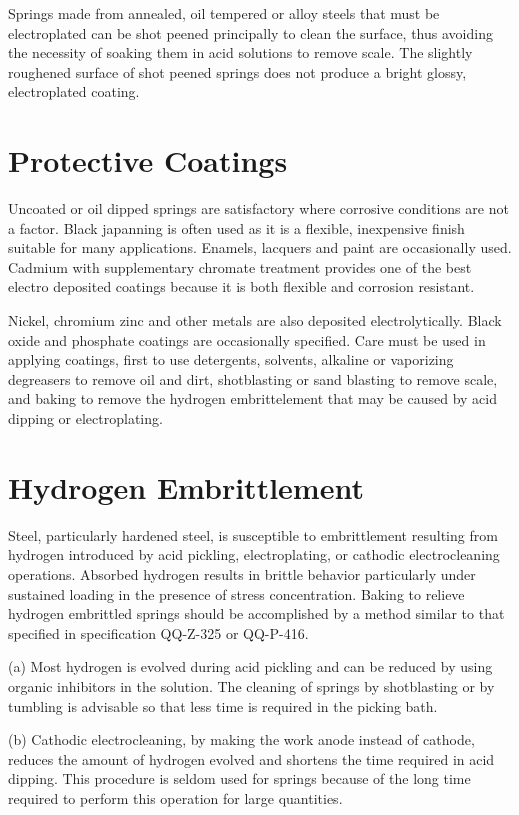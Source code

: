 \documentclass[10pt]{article}
\begin{document}
Springs made from annealed, oil tempered or alloy steels that must be electroplated can be shot peened principally to clean the surface, thus avoiding the necessity of soaking them in acid solutions to remove scale.
The slightly roughened surface of shot peened springs does not produce a bright glossy, electroplated coating.

\section{Protective Coatings} %
Uncoated or oil dipped springs are satisfactory where corrosive conditions are not a factor.
Black japanning is often used as it is a flexible, inexpensive finish suitable for many applications.
Enamels, lacquers and paint are occasionally used. 
Cadmium with supplementary chromate treatment provides one of the best electro deposited coatings because it is both flexible and corrosion resistant.

Nickel, chromium zinc and other metals are also deposited electrolytically.
Black oxide and phosphate coatings are occasionally specified.
Care must be used in applying coatings, first to use detergents, solvents, alkaline or vaporizing degreasers to remove oil and dirt, shotblasting or sand blasting to remove scale, and baking to remove the hydrogen embrittelement that may be caused by acid dipping or electroplating.

\section{Hydrogen Embrittlement} %
Steel, particularly hardened steel, is susceptible to embrittlement resulting from hydrogen introduced by acid pickling, electroplating, or cathodic electrocleaning operations.
Absorbed hydrogen results in brittle behavior particularly under sustained loading in the presence of stress concentration.
Baking to relieve hydrogen embrittled springs should be accomplished by a method similar to that specified in specification QQ-Z-325 or QQ-P-416.

(a) Most hydrogen is evolved during acid pickling and can be reduced by using organic inhibitors in the solution.
The cleaning of springs by shotblasting or by tumbling is advisable so that less time is required in the picking bath.

(b) Cathodic electrocleaning, by making the work anode instead of cathode, reduces the amount of hydrogen evolved and shortens the time required in acid dipping.
This procedure is seldom used for springs because of the long time required to perform this operation for large quantities.
\end{document}
